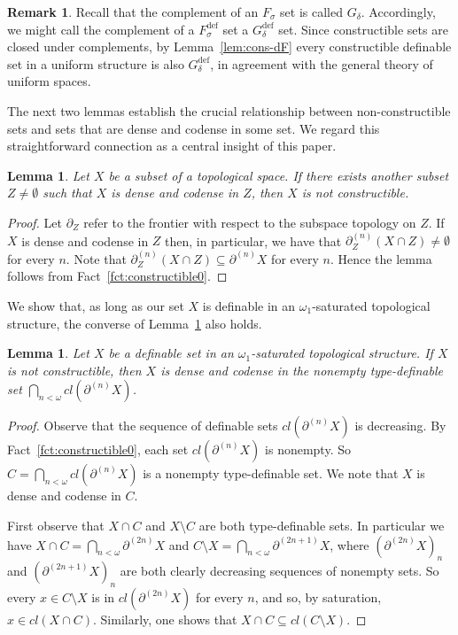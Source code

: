 \documentclass[12pt]{article}
\newcommand{\dF}{\ensuremath{F_\sigma^{\text{def}}}}
\newcommand{\dG}{\ensuremath{G_\delta^{\text{def}}}}
\newtheorem{lemma}[theorem]{Lemma}
\theoremstyle{definition}
\newtheorem{remark}[theorem]{Remark}
\theoremstyle{remark}
\begin{document}
\begin{remark}\label{rem:dG}
Recall that the complement of an $F_\sigma$ set is called $G_\delta$. Accordingly, we might call the complement of a $\dF$ set a $\dG$ set. Since constructible sets are closed under complements, by Lemma~\ref{lem:cons-dF} every constructible definable set in a uniform structure is also $\dG$, in agreement with the general theory of uniform spaces. 
\end{remark} 

The next two lemmas establish the crucial relationship between non-constructible sets and sets that are dense and codense in some set. We regard this straightforward connection as a central insight of this paper. 

\begin{lemma}\label{lem:cons-noise0}
Let $X$ be a subset of a topological space. If there exists another subset $Z\neq \emptyset$ such that $X$ is dense and codense in $Z$, then $X$ is not constructible. 
\end{lemma}
\begin{proof}
Let $\partial_Z$ refer to the frontier with respect to the subspace topology on $Z$. If $X$ is dense and codense in $Z$ then, in particular, we have that $\partial_Z^{(n)}(X\cap Z) \neq \emptyset$ for every $n$. Note that $\partial_Z^{(n)}(X\cap Z) \subseteq \partial^{(n)}X$ for every $n$. Hence the lemma follows from Fact~\ref{fct:constructible0}.
\end{proof}

We show that, as long as our set $X$ is definable in an $\omega_1$-saturated topological structure, the converse of Lemma~\ref{lem:cons-noise0} also holds. 

\begin{lemma}\label{lem:cons-noise1}
Let $X$ be a definable set in an $\omega_1$-saturated topological structure. If $X$ is not constructible, then $X$ is dense and codense in the nonempty type-definable set $\bigcap_{n<\omega} cl(\partial^{(n)}X)$.
\end{lemma}
\begin{proof}
Observe that the sequence of definable sets $cl(\partial^{(n)}X)$ is decreasing. By Fact~\ref{fct:constructible0}, each set $cl(\partial^{(n)}X)$ is nonempty. So $C=\bigcap_{n<\omega} cl(\partial^{(n)}X)$ is a nonempty type-definable set. We note that $X$ is dense and codense in $C$. 

First observe that $X\cap C$ and $X\setminus C$ are both type-definable sets. In particular we have $X\cap C=\bigcap_{n<\omega} \partial^{(2n)} X$ and $C\setminus X = \bigcap_{n<\omega} \partial^{(2n+1)} X$, where $(\partial^{(2n)} X)_n$ and $(\partial^{(2n+1)} X)_n$ are both clearly decreasing sequences of nonempty sets. So every $x\in C\setminus X$ is in $cl(\partial^{(2n)} X)$ for every $n$, and so, by saturation, $x\in cl(X\cap C)$. Similarly, one shows that $X\cap C \subseteq cl(C\setminus X)$.  
\end{proof}
\end{document}
